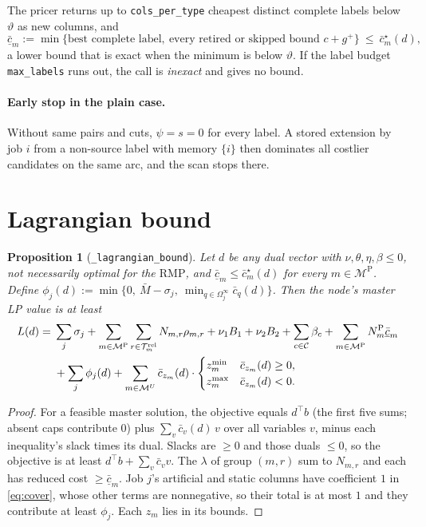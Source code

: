 \documentclass[11pt,a4paper]{article}
\newtheorem{proposition}[theorem]{Proposition}
\theoremstyle{definition}
\theoremstyle{remark}
\newcommand{\M}{\mathcal{M}}
\newcommand{\MP}{\M^{\mathrm{P}}}
\newcommand{\MU}{\M^{U}}
\newcommand{\Rel}{\mathcal{T}^{\mathrm{rel}}}
\newcommand{\Om}{\Omega}
\newcommand{\Cuts}{\mathcal{C}}
\newcommand{\code}[1]{\texttt{#1}}
\newcommand{\rc}{\bar c}
\newcommand{\RMP}{\mathrm{RMP}}
\begin{document}
The pricer returns up to \texttt{cols\_per\_type} cheapest distinct complete
labels below $\vartheta$ as new columns, and
\[
\underline{\rc}_m:=\min\bigl\{\text{best complete label},\ \text{every retired or skipped bound } c+g^+\bigr\}\ \le\ \rc^\star_m(d),
\]
a lower bound that is exact when the minimum is below $\vartheta$. If the label
budget \texttt{max\_labels} runs out, the call is \emph{inexact} and gives no
bound.

\paragraph{Early stop in the plain case.} Without same pairs and cuts,
$\psi=s=0$ for every label. A stored extension by job $i$ from a non-source
label with memory $\{i\}$ then dominates all costlier candidates on the same
arc, and the scan stops there.

\section{Lagrangian bound}\label{sec:lagr}

\begin{proposition}[\code{\_lagrangian\_bound}]\label{prop:lagr}
Let $d$ be any dual vector with $\nu,\theta,\eta,\beta\le0$, not necessarily
optimal for the $\RMP$, and $\underline{\rc}_m\le\rc^\star_m(d)$ for every
$m\in\MP$. Define
$\phi_j(d):=\min\{0,\ \bar M-\sigma_j,\ \min_{q\in\Om^\infty_j}\rc_q(d)\}$.
Then the node's master LP value is at least
\begin{align}
L(d)={}&\sum_{j}\sigma_j+\sum_{m\in\MP}\sum_{r\in\Rel_m}N_{m,r}\rho_{m,r}
+\nu_1B_1+\nu_2B_2+\sum_{c\in\Cuts}\beta_c
+\sum_{m\in\MP}N^{\mathrm P}_m\underline{\rc}_m \notag\\
&+\sum_{j}\phi_j(d)
+\sum_{m\in\MU}\rc_{z_m}(d)\cdot\begin{cases}z^{\min}_m&\rc_{z_m}(d)\ge0,\\ z^{\max}_m&\rc_{z_m}(d)<0.\end{cases}
\label{eq:lagr}
\end{align}
\end{proposition}

\begin{proof}
For a feasible master solution, the objective equals $d^\top b$ (the first
five sums; absent caps contribute $0$) plus $\sum_v\rc_v(d)\,v$ over all
variables $v$, minus each inequality's slack times its dual. Slacks are
$\ge0$ and those duals $\le0$, so the objective is at least
$d^\top b+\sum_v\rc_v v$. The $\lambda$ of group $(m,r)$ sum to $N_{m,r}$ and
each has reduced cost $\ge\underline{\rc}_m$. Job $j$'s artificial and static
columns have coefficient $1$ in \eqref{eq:cover}, whose other terms are
nonnegative, so their total is at most $1$ and they contribute at least
$\phi_j$. Each $z_m$ lies in its bounds.
\end{proof}
\end{document}
